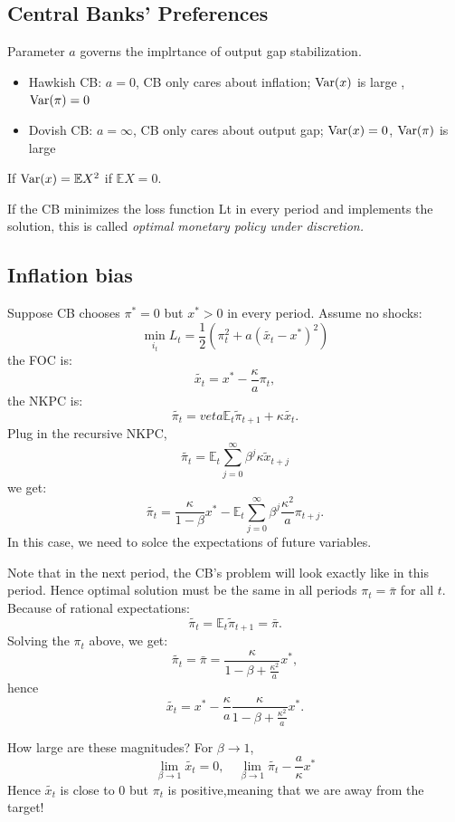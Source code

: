 \subsection{Central Banks' Preferences}
Parameter $a$ governs the implrtance of output gap stabilization.
\begin{itemize}
    \item Hawkish CB: $a = 0$, CB only cares about inflation; $\operatorname{Var}(x)$ is large , $\operatorname{Var}(\pi)=0$
    \item Dovish CB: $a = \infty$, CB only cares about output gap; $\operatorname{Var}(x)=0$, $\operatorname{Var}(\pi)$ is large
\end{itemize}
If $\operatorname{Var}(x) = \mathbb{E}X^2$ if $\mathbb{E}X = 0$.

If the CB minimizes the loss function Lt in every period and
implements the solution, this is called \textit{optimal monetary policy
under discretion.}

\subsection{Inflation bias}
Suppose CB chooses $\pi ^* = 0$ but $x^* > 0$ in every period.
Assume no shocks:
\[\min_{i_t}L_t = \frac{1}{2} \left(\pi_t^2 + a(\tilde{x_t} - x^*)^2\right)\]
the FOC is:
\[\tilde{x_t} = x^* - \frac{\kappa}{a}\pi_t,\]
the NKPC is:
\[\tilde{\pi_t} = veta\mathbb{E}_t \tilde{\pi}_{t+1} + \kappa\tilde{x_t}. \]
Plug in the recursive NKPC,
\[\tilde{\pi_t} = \mathbb{E}_t \sum_{j=0}^{\infty }\beta^j \kappa \tilde{x}_{t+j} \]
we get:
\[\tilde{\pi_t} = \frac{\kappa}{1-\beta} x^* - \mathbb{E}_t \sum_{j=0}^{\infty}\beta^j \frac{\kappa^2}{a} \pi_{t+j}. \]
In this case, we need to solce the expectations of future variables.

Note that in the next period, the CB's problem will look exactly like in
this period. Hence optimal solution must be the same in all periods $\pi_t = \bar{\pi}$
for all $t$. Because of rational expectations:
\[\tilde{\pi_t} = \mathbb{E}_t \tilde{\pi}_{t+1} = \bar{\pi}. \]
Solving the $\pi_t$ above, we get:
\[\tilde{\pi_t} = \bar{\pi} = \frac{\kappa}{1-\beta + \frac{\kappa^2}{a}}x^*,\]
hence
\[\tilde{x_t} = x^* - \frac{\kappa}{a} \frac{\kappa}{1-\beta + \frac{\kappa^2}{a}}x^*.\]

How large are these magnitudes? For $\beta \to 1$,
\[\lim_{\beta \to 1} \tilde{x_t} = 0, \quad \lim_{\beta \to 1} \tilde{\pi_t} - \frac{a}{\kappa}x^*\]
Hence $\tilde{x_t}$ is close to 0 but $\pi_t$ is positive,meaning that we are away from the target!

